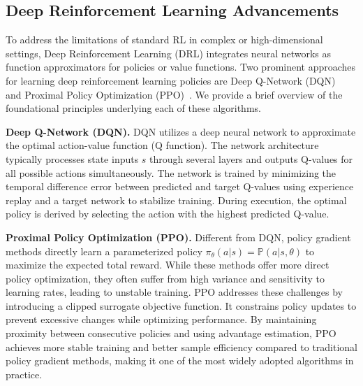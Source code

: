 \subsection{Deep Reinforcement Learning Advancements}

To address the limitations of standard RL in complex or high-dimensional settings, Deep Reinforcement Learning (DRL) integrates neural networks as function approximators for policies or value functions. Two prominent approaches for learning deep reinforcement learning policies are Deep Q-Network (DQN)~\citep{mnih2015human} and Proximal Policy Optimization (PPO)~\citep{schulman2017proximal}. We provide a brief overview of the foundational principles underlying each of these algorithms.

\textbf{Deep Q-Network (DQN). }
DQN utilizes a deep neural network to approximate the optimal action-value function (Q function). The network architecture typically processes state inputs $s$ through several layers and outputs Q-values for all possible actions simultaneously. The network is trained by minimizing the temporal difference error between predicted and target Q-values using experience replay and a target network to stabilize training. During execution, the optimal policy is derived by selecting the action with the highest predicted Q-value.

\textbf{Proximal Policy Optimization (PPO).}
Different from DQN, policy gradient methods directly learn a parameterized policy $\pi_{\theta}(a|s) = \mathbb{P}(a|s,\theta)$ to maximize the expected total reward. While these methods offer more direct policy optimization, they often suffer from high variance and sensitivity to learning rates, leading to unstable training. PPO addresses these challenges by introducing a clipped surrogate objective function. It constrains policy updates to prevent excessive changes while optimizing performance. By maintaining proximity between consecutive policies and using advantage estimation, PPO achieves more stable training and better sample efficiency compared to traditional policy gradient methods, making it one of the most widely adopted algorithms in practice.



